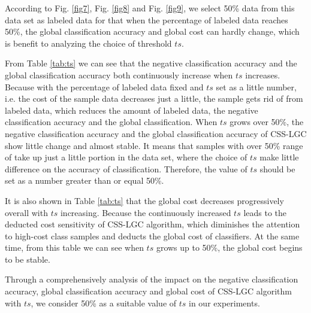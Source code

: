 \documentclass{svjour3}                     %
\begin{document}
According to Fig. \ref{fig7}, Fig. \ref{fig8} and Fig. \ref{fig9}, we select 50\% data from this data set as labeled data for that when the percentage of labeled data reaches 50\%, the global classification accuracy and global cost can hardly change, which is benefit to analyzing the choice of threshold $ts$.

From Table \ref{tab:ts} we can see that the negative classification accuracy and the global classification accuracy both continuously increase when $ts$ increases. Because with the percentage of labeled data fixed and $ts$ set as a little number, i.e. the cost of the sample data decreases just a little, the sample gets rid of from labeled data, which reduces the amount of labeled data, the negative classification accuracy and the global classification. When $ts$ grows over 50\%, the negative classification accuracy and the global classification accuracy of CSS-LGC show little change and almost stable. It means that samples with over 50\% range of take up just a little portion in the data set, where the choice of $ts$ make little difference on the accuracy of classification. Therefore, the value of $ts$ should be set as a number greater than or equal 50\%.

It is also shown in Table \ref{tab:ts} that the global cost decreases progressively overall with $ts$ increasing. Because the continuously increased $ts$ leads to the deducted cost sensitivity of CSS-LGC
algorithm, which diminishes the attention to high-cost class samples and deducts the global cost of classifiers. At the same time, from this table we can see when $ts$ grows up to 50\%, the global cost begins to be stable. 

Through a comprehensively analysis of the impact on the negative classification accuracy, global classification accuracy and global cost of CSS-LGC algorithm with $ts$, we consider 50\% as a suitable value of $ts$ in our experiments.
\end{document}

